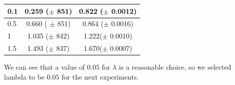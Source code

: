 \begin{minipage}{\textwidth}
\begin{minipage}[b]{0.5\textwidth}
\begin{center}
\begin{tabular}{ |l | c | c| }
     0.1     & 0.259 ($\pm$ 851)  & 0.822 ($\pm$ 0.0012) \\ \hline
     0.5    & 0.660  ( $\pm$ 851) & 0.864 ($\pm$  0.0016)\\ \hline
     1       & 1.035 ($\pm$ 842) & 1.222($\pm$  0.0010)\\ \hline
     1.5    & 1.493 ($\pm$ 837) & 1.670($\pm$  0.0007) \\
    \hline
  \end{tabular}
  	\label{table:labda_choice}
\end{center}
	\vspace{10 mm}
    \end{minipage}
  \end{minipage}
  
We can see that a value of $0.05$ for $\lambda$ is a reasonable choice, so we selected lambda to be $0.05$ for the next experiments. 

 
